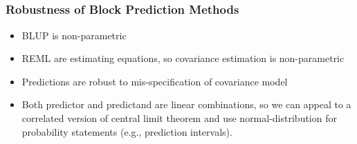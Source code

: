 \documentclass[mathserif,compress]{beamer}\usepackage{graphicx, color}
\begin{document}
\subsection{}
\begin{frame}[fragile]
\frametitle{Robustness of Block Prediction Methods}

\begin{itemize}
	\item BLUP is non-parametric
	\item REML are estimating equations, so covariance estimation is non-parametric
	\item Predictions are robust to mis-specification of covariance model
	\item Both predictor and predictand are linear combinations, so we can appeal to a correlated version of central limit theorem and use normal-distribution for probability statements (e.g., prediction intervals).
\end{itemize}

\end{frame}
\end{document}
